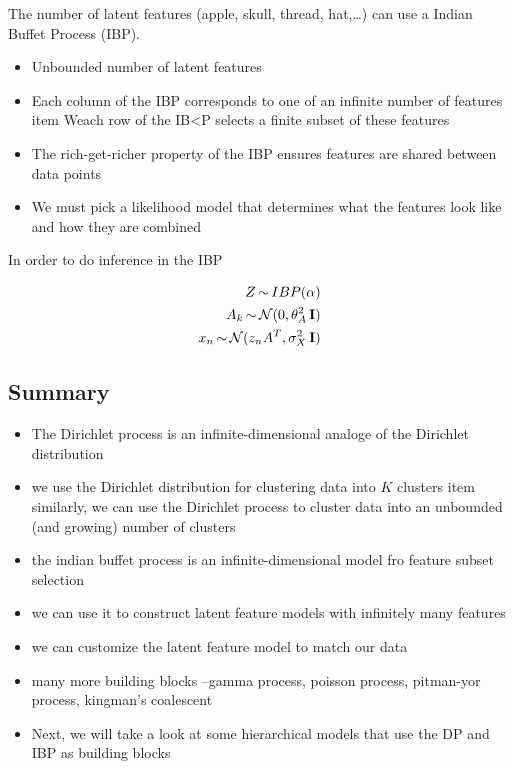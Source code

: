 The number of latent features (apple, skull, thread, hat,\dots) can use a
Indian Buffet Process (IBP).

\begin{itemize}
  \item Unbounded number of latent features
  \item Each column of the IBP corresponds to one of an infinite number of
    features
  item Weach row of the IB<P selects a finite subset of these features
  \item The rich-get-richer property of the IBP ensures features are shared
  between data points
  \item We must pick a likelihood model that determines what the features look
    like and how they are combined
\end{itemize}

In order to do inference in the IBP

\begin{align}
  Z \operatorname*{\sim} IBP(\alpha) \\
  A_k \operatorname*{\sim} \operatorname*{\mathcal{N}}(0, \theta_A^2 \operatorname*{\mathbf{I}}) \\
  x_n \operatorname*{\sim} \operatorname*{\mathcal{N}}(z_nA^T, \sigma_X^2\operatorname*{\mathbf{I}})
\end{align}

\subsection{Summary}

\begin{itemize}
  \item The Dirichlet process is an infinite-dimensional analoge of the
    Dirichlet distribution
  \item we use the Dirichlet distribution for clustering data into $K$ clusters
  item similarly, we can use the Dirichlet process to cluster data into an
  unbounded (and growing) number of clusters
\item the indian buffet process is an infinite-dimensional model fro feature
  subset selection
\item we can use it to construct latent feature models with infinitely many
  features
\item we can customize the latent feature model to match our data
\item many more building blocks --gamma process, poisson process, pitman-yor
  process, kingman's coalescent
\item Next, we will take a look at some hierarchical models that use the DP and
  IBP as building blocks
\end{itemize}


